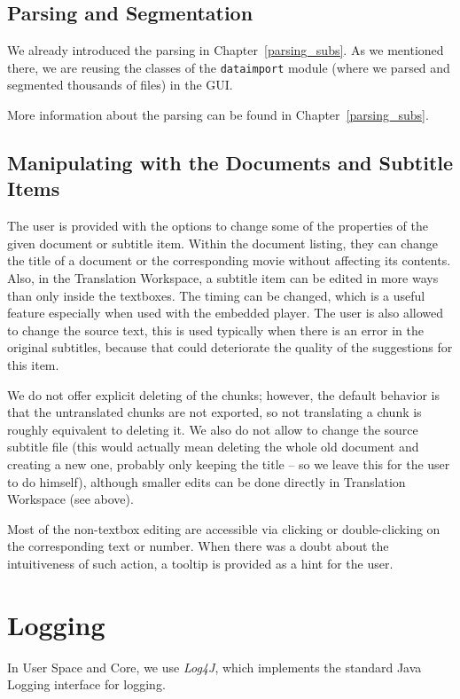 \subsection{Parsing and Segmentation}
We already introduced the parsing in Chapter~\ref{parsing_subs}. As we mentioned there, we are reusing the classes of the {\tt dataimport} module (where we parsed and segmented thousands of files) in the GUI.

More information about the parsing can be found in Chapter~\ref{parsing_subs}.


\subsection{Manipulating with the Documents and Subtitle Items}

The user is provided with the options to change some of the properties of the given document or subtitle item. Within the document listing, they can change the title of a document or the corresponding movie without affecting its contents. Also, in the Translation Workspace, a subtitle item can be edited in more ways than only inside the textboxes. The timing can be changed, which is a useful feature especially when used with the embedded player. The user is also allowed to change the source text, this is used typically when there is an error in the original subtitles, because that could deteriorate the quality of the suggestions for this item.

We do not offer explicit deleting of the chunks; however, the default behavior is that the untranslated chunks are not exported, so not translating a chunk is roughly equivalent to deleting it. We also do not allow to change the source subtitle file (this would actually mean deleting the whole old document and creating a new one, probably only keeping the title -- so we leave this for the user to do himself), although smaller edits can be done directly in Translation Workspace (see above).

Most of the non-textbox editing are accessible via clicking or double-clicking on the corresponding text or number. When there was a doubt about the intuitiveness of such action, a tooltip is provided as a hint for the user.



\section{Logging}
\label{gui:logging}
In User Space and Core, we use \emph{Log4J}, which implements the standard Java Logging interface for logging.

